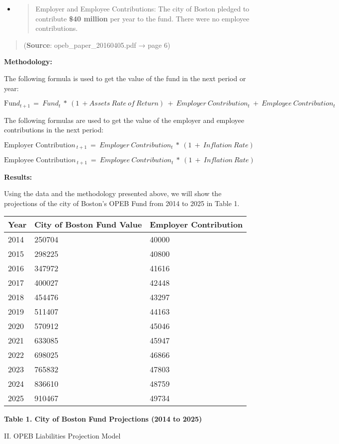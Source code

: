 \documentclass[
]{article}
\begin{document}
\begin{itemize}
\item
  \begin{quote}
  Employer and Employee Contributions: The city of Boston pledged to
  contribute \textbf{\$40 million} per year to the fund. There were no
  employee contributions.
  \end{quote}
\end{itemize}

\begin{quote}
(\textbf{{Source}}: opeb\_paper\_20160405.pdf → page 6)
\end{quote}

\textbf{{Methodology:}}

The following formula is used to get the value of the fund in the next
period or year:

\(\text{Fun}d_{t + 1\ } = \ Fund_{t}\ *\ (1\  + Assets\ Rate\ of\ Return)\  + \ Employer\ Contribution_{t}\  + \ Employee\ Contribution_{t}\)

The following formulas are used to get the value of the employer and
employee contributions in the next period:

\(\text{Employer\ Contributio}n_{\ t + 1}\  = \ Employer\ Contribution_{t}\ *\ (1\  + \ Inflation\ Rate)\ \)

\(\text{Employee\ Contributio}n_{\ t + 1}\  = \ Employee\ Contribution_{t}\ *\ (1\  + \ Inflation\ Rate)\)

\textbf{{Results:}}

Using the data and the methodology presented above, we will show the
projections of the city of Boston's OPEB Fund from 2014 to 2025 in Table
1.

\begin{longtable}[]{@{}lll@{}}
\toprule
Year & City of Boston Fund Value & Employer Contribution\tabularnewline
\midrule
\endhead
2014 & 250704 & 40000\tabularnewline
2015 & 298225 & 40800\tabularnewline
2016 & 347972 & 41616\tabularnewline
2017 & 400027 & 42448\tabularnewline
2018 & 454476 & 43297\tabularnewline
2019 & 511407 & 44163\tabularnewline
2020 & 570912 & 45046\tabularnewline
2021 & 633085 & 45947\tabularnewline
2022 & 698025 & 46866\tabularnewline
2023 & 765832 & 47803\tabularnewline
2024 & 836610 & 48759\tabularnewline
2025 & 910467 & 49734\tabularnewline
\bottomrule
\end{longtable}

\textbf{Table 1. City of Boston Fund Projections (2014 to 2025)}

II. OPEB Liabilities Projection Model
\end{document}
